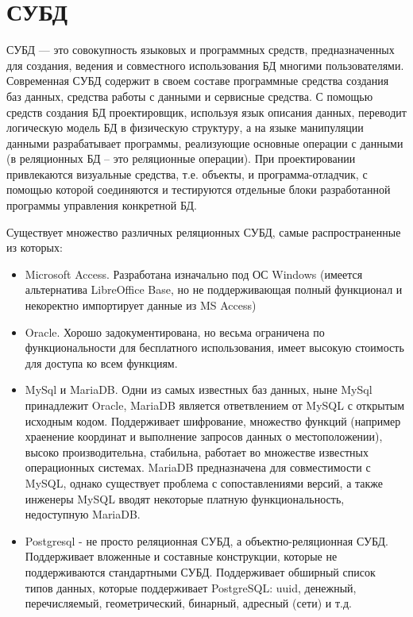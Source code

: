 \section{СУБД}
СУБД --- это совокупность языковых и программных средств, предназначенных для создания, ведения и совместного использования БД многими пользователями. \cite{web:bseu}
Современная СУБД содержит в своем составе программные средства создания баз данных, средства работы с данными и сервисные средства. С помощью средств создания БД проектировщик, используя язык описания данных, переводит логическую модель БД в физическую структуру, а на языке манипуляции данными разрабатывает программы, реализующие основные операции с данными (в реляционных БД – это реляционные операции). При проектировании привлекаются визуальные средства, т.е. объекты, и программа-отладчик, с помощью которой соединяются и тестируются отдельные блоки разработанной программы управления конкретной БД.

Существует множество различных реляционных СУБД, самые распространенные из которых:
\begin{itemize}
    \item
        Microsoft Access.
        Разработана изначально под ОС Windows (имеется альтернатива LibreOffice Base, но не поддерживающая полный функционал и некоректно импортирует данные из MS Access)
    \item
        Oracle.
        Хорошо задокументирована, но весьма ограничена по функциональности для бесплатного использования, имеет высокую стоимость для доступа ко всем функциям. 
    \item
        MySql и MariaDB. Одни из самых известных баз данных, ныне MySql принадлежит Oracle, MariaDB является ответвлением от MySQL с открытым исходным кодом. Поддерживает шифрование, множество функций (например храенение координат и выполнение запросов данных о местоположении), высоко производительна, стабильна, работает во множестве известных операционных системах. MariaDB предназначена для совместимости с MySQL, однако существует проблема с сопоставлениями версий, а также инженеры MySQL вводят некоторые платную функциональность, недоступную MariaDB. \cite{web:drach}
    \item 
        Postgresql - не просто реляционная СУБД, а объектно-реляционная СУБД. Поддерживает вложенные и составные конструкции, которые не поддерживаются стандартными СУБД. Поддерживает обширный список типов данных, которые поддерживает PostgreSQL: uuid, денежный, перечисляемый, геометрический, бинарный, адресный (сети) и т.д. \cite{web:postgreshabr}
\end{itemize}
